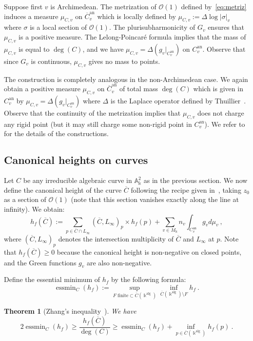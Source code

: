 \documentclass[11 pt, oneside, a4paper]{amsart}
\newcommand{\nA}{\mathbb{A}}
\newcommand{\mc}{\mathcal}
\newcommand{\ol}{\overline}
\newcommand{\abs}[1]{{\left|{#1}\right|}}
\newcommand{\nk}{\Bbbk}
\DeclareMathOperator{\an}{an}
\DeclareMathOperator{\alg}{alg}
\DeclareMathOperator{\essmin}{\mathrm{essmin}}
\newtheorem{thm}{Theorem}[section]
\theoremstyle{definition}
\theoremstyle{definition}
\begin{document}
 
Suppose first $v$ is Archimedean. The metrization of $\mc{O}(1)$ defined by~\eqref{eq:metriz}
induces a measure $\mu_{C,v}$ on $\overline{C}^{\an}_v$ which is locally defined by 
 $\mu_{C,v} := \Delta \log \abs{\sigma}_v$ where $\sigma$ is a local section of  $\mc{O}(1)$.
  The plurisubharmonicity of $G_v$ ensures that  $\mu_{C,v}$ is a positive measure. 
 The  Lelong-Poincaré  formula  implies that 
  the mass of $\mu_{C,v}$ is equal to $\deg(C)$, and we have $\mu_{C,v} = \Delta (g_v|_{C^{\an}_v})$ 
  on $C^{\an}_v$. Observe that since $G_v$ is continuous, $\mu_{C,v}$ gives no mass to points. 

 
  The construction is completely analogous in the non-Archimedean case.
We again obtain a positive measure $\mu_{C,v}$ on $\overline{C}^{\an}_v$ of total mass $\deg(C)$ which is given in 
$C^{\an}_v$ by  $\mu_{C,v} = \Delta (g_v|_{C^{\an}_v})$ where $\Delta$ is the Laplace operator defined by Thuillier~\cite{thuillier:phdthesis}.
Observe that the continuity of the metrization implies that $\mu_{C,v}$ does not
 charge any rigid point (but it may still charge some non-rigid point
in $C^{\an}_v$). 
We refer to~\cite[\S 1.3]{ACL2} for the details of the constructions. 

\subsection{Canonical heights on curves}
Let $C$ be any irreducible algebraic curve in $\nA^2_\nk$ as in the previous section. 
We now define the canonical height of the curve $\overline{C}$ following the recipe  given  in~\cite[\S 3.1.2]{ACL2}, 
taking $z_0$ as a section of $\mc{O}(1)$ (note that this section vanishes exactly along the line at infinity). 
We obtain: 
\begin{equation}\label{eq:01}
h_f(\ol{C}) := \sum_{p\in \overline{C} \cap L_\infty}  (\overline{C}, L_\infty)_p \times  h_f(p) + \sum_{v\in M_\nk}  n_v
\int_{C^{\an}_v}  g_v d \mu_v~,
\end{equation}
{where $ (\overline{C}, L_\infty)_p$ denotes the   intersection multiplicity of  $\overline{C}$ and $L_\infty$ at $p$}. 
Note that $h_f(\ol{C}) \ge 0$ because  the canonical height is non-negative on closed points, and the Green functions $g_v$
are also non-negative. 


Define the essential minimum of $h_f$ by the following formula: 
\[
 \essmin_C(h_f) := \sup_{F \text{ finite} \subset \overline{C}(\nk^{\alg})} \inf_{\overline{C}(\nk^{\alg}) \setminus F} h_f~.
\]
\begin{thm}[Zhang's inequality~{\cite[Theorem 1.10]{zhang:smallpointsadelicmetrics}}]\label{thm:Zh}
We have
\[
2  \essmin_C(h_f)\ge \frac{h_f(\overline{C})}{\deg(C)} \ge  \essmin_C(h_f)+ \inf_{p\in \overline{C}(\nk^{\alg})} h_f(p)
~.\]
\end{thm}
\end{document}
